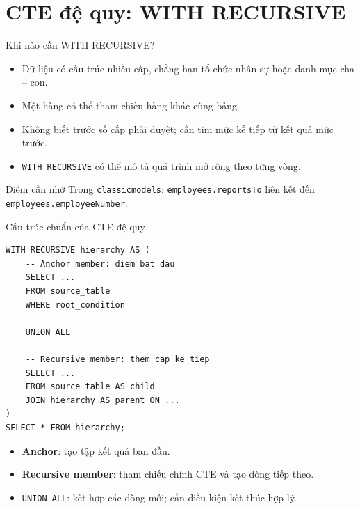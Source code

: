 \documentclass[aspectratio=169,10pt]{beamer}
\newcommand{\code}[1]{\texttt{#1}}
\begin{document}
\section{CTE đệ quy: WITH RECURSIVE}

\begin{frame}[fragile]{Khi nào cần WITH RECURSIVE?}
\small
\begin{itemize}
\item Dữ liệu có cấu trúc nhiều cấp, chẳng hạn tổ chức nhân sự hoặc danh mục cha -- con.
\item Một hàng có thể tham chiếu hàng khác cùng bảng.
\item Không biết trước số cấp phải duyệt; cần tìm mức kế tiếp từ kết quả mức trước.
\item \code{WITH RECURSIVE} có thể mô tả quá trình mở rộng theo từng vòng.
\end{itemize}
\vspace{.3em}\begin{block}{Điểm cần nhớ}
Trong \code{classicmodels}: \code{employees.reportsTo} liên kết đến \code{employees.employeeNumber}.
\end{block}
\end{frame}

\begin{frame}[fragile]{Cấu trúc chuẩn của CTE đệ quy}
\small
\begin{lstlisting}[basicstyle=\ttfamily\scriptsize]
WITH RECURSIVE hierarchy AS (
    -- Anchor member: diem bat dau
    SELECT ...
    FROM source_table
    WHERE root_condition

    UNION ALL

    -- Recursive member: them cap ke tiep
    SELECT ...
    FROM source_table AS child
    JOIN hierarchy AS parent ON ...
)
SELECT * FROM hierarchy;
\end{lstlisting}
\vspace{.1em}
\begin{itemize}
\item \textbf{Anchor}: tạo tập kết quả ban đầu.
\item \textbf{Recursive member}: tham chiếu chính CTE và tạo dòng tiếp theo.
\item \code{UNION ALL}: kết hợp các dòng mới; cần điều kiện kết thúc hợp lý.
\end{itemize}
\end{frame}
\end{document}
